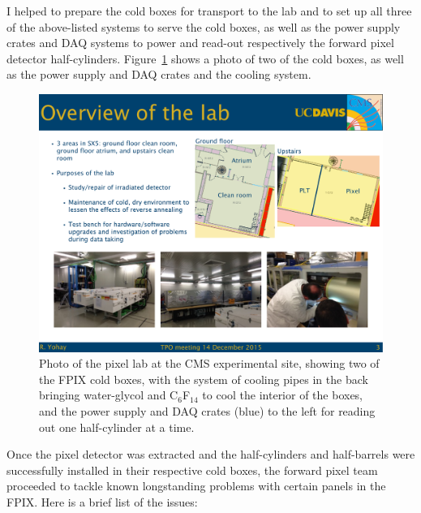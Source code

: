 I helped to prepare the cold boxes for transport to the lab and to set up all three of the above-listed systems to serve the cold boxes, as well as the power supply crates and DAQ systems to power and read-out respectively the forward pixel detector half-cylinders. Figure~\ref{fig:fpix-cleanroom} shows a photo of two of the cold boxes, as well as the power supply and DAQ crates and the cooling system.

\begin{figure}[hbtp]
  \begin{center}
    \includegraphics[width=1.5\cmsFigWidth]{figures/fpix-cleanroom}
    \caption{Photo of the pixel lab at the CMS experimental site, showing two of the FPIX cold boxes, with the system of cooling pipes in the back bringing water-glycol and C$_{6}$F$_{14}$ to cool the interior of the boxes, and the power supply and DAQ crates (blue) to the left for reading out one half-cylinder at a time.}
    \label{fig:fpix-cleanroom}
  \end{center}
\end{figure}

Once the pixel detector was extracted and the half-cylinders and half-barrels were successfully installed in their respective cold boxes, the forward pixel team proceeded to tackle known longstanding problems with certain panels in the FPIX. Here is a brief list of the issues:

